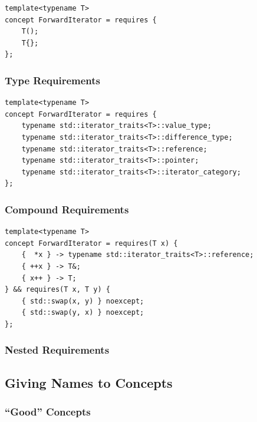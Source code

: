         \begin{lstlisting}
template<typename T>
concept ForwardIterator = requires {
    T();
    T{};
}; \end{lstlisting}

        \subsubsection*{Type Requirements} \label{sec:type_requirements}

        \begin{lstlisting}
template<typename T>
concept ForwardIterator = requires {
    typename std::iterator_traits<T>::value_type;
    typename std::iterator_traits<T>::difference_type;
    typename std::iterator_traits<T>::reference;
    typename std::iterator_traits<T>::pointer;
    typename std::iterator_traits<T>::iterator_category;
}; \end{lstlisting}

        \subsubsection*{Compound Requirements} \label{sec:compound_requirements}

        \begin{lstlisting}
template<typename T>
concept ForwardIterator = requires(T x) {
    {  *x } -> typename std::iterator_traits<T>::reference;
    { ++x } -> T&;
    { x++ } -> T;
} && requires(T x, T y) {
    { std::swap(x, y) } noexcept;
    { std::swap(y, x) } noexcept;
}; \end{lstlisting}

        \subsubsection*{Nested Requirements} \label{sec:nested_requirements}

        

        \newpage

\subsection{Giving Names to Concepts} \label{sec:giving_names_to_concepts}

    

    

    \subsubsection{``Good'' Concepts} \label{sec:good_concepts}
